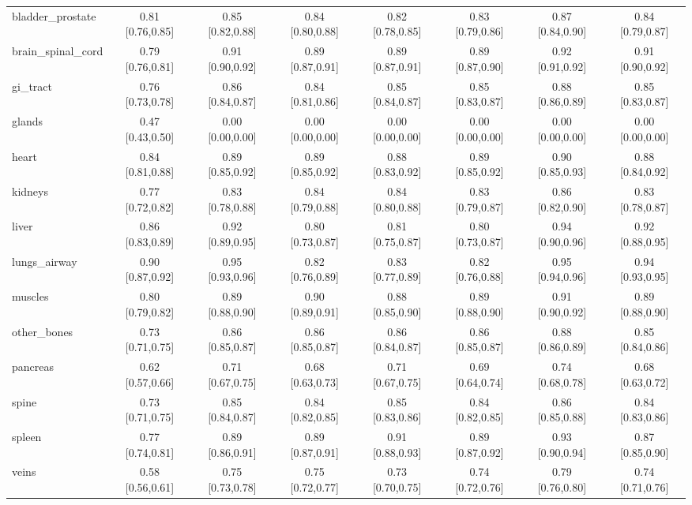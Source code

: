 \begin{tabular}{lccccccc}
bladder\_prostate & 0.81 [0.76,0.85] & 0.85 [0.82,0.88] & 0.84 [0.80,0.88] & 0.82 [0.78,0.85] & 0.83 [0.79,0.86] & 0.87 [0.84,0.90] & 0.84 [0.79,0.87] \\
brain\_spinal\_cord & 0.79 [0.76,0.81] & 0.91 [0.90,0.92] & 0.89 [0.87,0.91] & 0.89 [0.87,0.91] & 0.89 [0.87,0.90] & 0.92 [0.91,0.92] & 0.91 [0.90,0.92] \\
gi\_tract & 0.76 [0.73,0.78] & 0.86 [0.84,0.87] & 0.84 [0.81,0.86] & 0.85 [0.84,0.87] & 0.85 [0.83,0.87] & 0.88 [0.86,0.89] & 0.85 [0.83,0.87] \\
glands & 0.47 [0.43,0.50] & 0.00 [0.00,0.00] & 0.00 [0.00,0.00] & 0.00 [0.00,0.00] & 0.00 [0.00,0.00] & 0.00 [0.00,0.00] & 0.00 [0.00,0.00] \\
heart & 0.84 [0.81,0.88] & 0.89 [0.85,0.92] & 0.89 [0.85,0.92] & 0.88 [0.83,0.92] & 0.89 [0.85,0.92] & 0.90 [0.85,0.93] & 0.88 [0.84,0.92] \\
kidneys & 0.77 [0.72,0.82] & 0.83 [0.78,0.88] & 0.84 [0.79,0.88] & 0.84 [0.80,0.88] & 0.83 [0.79,0.87] & 0.86 [0.82,0.90] & 0.83 [0.78,0.87] \\
liver & 0.86 [0.83,0.89] & 0.92 [0.89,0.95] & 0.80 [0.73,0.87] & 0.81 [0.75,0.87] & 0.80 [0.73,0.87] & 0.94 [0.90,0.96] & 0.92 [0.88,0.95] \\
lungs\_airway & 0.90 [0.87,0.92] & 0.95 [0.93,0.96] & 0.82 [0.76,0.89] & 0.83 [0.77,0.89] & 0.82 [0.76,0.88] & 0.95 [0.94,0.96] & 0.94 [0.93,0.95] \\
muscles & 0.80 [0.79,0.82] & 0.89 [0.88,0.90] & 0.90 [0.89,0.91] & 0.88 [0.85,0.90] & 0.89 [0.88,0.90] & 0.91 [0.90,0.92] & 0.89 [0.88,0.90] \\
other\_bones & 0.73 [0.71,0.75] & 0.86 [0.85,0.87] & 0.86 [0.85,0.87] & 0.86 [0.84,0.87] & 0.86 [0.85,0.87] & 0.88 [0.86,0.89] & 0.85 [0.84,0.86] \\
pancreas & 0.62 [0.57,0.66] & 0.71 [0.67,0.75] & 0.68 [0.63,0.73] & 0.71 [0.67,0.75] & 0.69 [0.64,0.74] & 0.74 [0.68,0.78] & 0.68 [0.63,0.72] \\
spine & 0.73 [0.71,0.75] & 0.85 [0.84,0.87] & 0.84 [0.82,0.85] & 0.85 [0.83,0.86] & 0.84 [0.82,0.85] & 0.86 [0.85,0.88] & 0.84 [0.83,0.86] \\
spleen & 0.77 [0.74,0.81] & 0.89 [0.86,0.91] & 0.89 [0.87,0.91] & 0.91 [0.88,0.93] & 0.89 [0.87,0.92] & 0.93 [0.90,0.94] & 0.87 [0.85,0.90] \\
veins & 0.58 [0.56,0.61] & 0.75 [0.73,0.78] & 0.75 [0.72,0.77] & 0.73 [0.70,0.75] & 0.74 [0.72,0.76] & 0.79 [0.76,0.80] & 0.74 [0.71,0.76] \\

\end{tabular}
